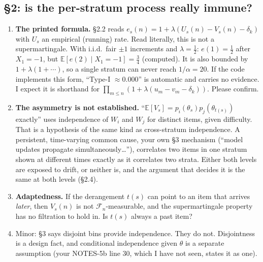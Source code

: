 \documentclass[11pt]{article}
\newcommand{\E}{\mathbb{E}}
\newcommand{\Fc}{\mathcal{F}}
\begin{document}
\subsection{\S2: is the per-stratum process really immune?}
\begin{enumerate}[nosep]
\item \textbf{The printed formula.} \S2.2 reads $e_s(n)=1+\lambda(U_s(n)-V_s(n)-\delta_k)$ with $U_s$ an empirical (running) rate. Read literally, this is not a supermartingale. With i.i.d.\ fair $\pm1$ increments and $\lambda=\tfrac12$: $e(1)=\tfrac12$ after $X_1=-1$, but $\E[e(2)\mid X_1=-1]=\tfrac34$ (computed). It is also bounded by $1+\lambda(1+\cdots)$, so a single stratum can never reach $1/\alpha=20$. If the code implements this form, ``Type-I $\approx0.000$'' is automatic and carries no evidence. I expect it is shorthand for $\prod_{m\le n}(1+\lambda(u_m-v_m-\delta_k))$. Please confirm.
\item \textbf{The asymmetry is not established.} ``$\E[V_s]=p_i(\theta_s)p_j(\theta_{t(s)})$ exactly'' uses independence of $W_i$ and $W_j$ for distinct items, given difficulty. That is a hypothesis of the same kind as cross-stratum independence. A persistent, time-varying common cause, your own \S3 mechanism (``model updates propagate simultaneously\ldots''), correlates two items in one stratum shown at different times exactly as it correlates two strata. Either both levels are exposed to drift, or neither is, and the argument that decides it is the same at both levels (\S2.4).
\item \textbf{Adaptedness.} If the derangement $t(s)$ can point to an item that arrives \emph{later}, then $V_s(n)$ is not $\Fc_n$-measurable, and the supermartingale property has no filtration to hold in. Is $t(s)$ always a past item?
\item Minor: \S3 says disjoint bins provide independence. They do not. Disjointness is a design fact, and conditional independence given $\theta$ is a separate assumption (your NOTES-5b line 30, which I have not seen, states it as one).
\end{enumerate}
\end{document}
